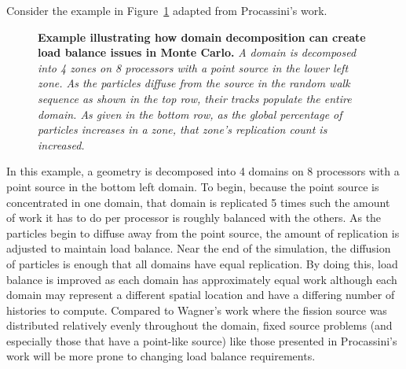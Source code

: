 Consider the example in Figure~\ref{fig:procassini_example} adapted
from Procassini's work.
\begin{figure}[t!]
  \begin{center}
    \scalebox{1.5}{
       }
  \end{center}
  \caption{\textbf{Example illustrating how domain decomposition can
      create load balance issues in Monte Carlo.}  \textit{A domain is
      decomposed into 4 zones on 8 processors with a point source in
      the lower left zone. As the particles diffuse from the source in
      the random walk sequence as shown in the top row, their tracks
      populate the entire domain. As given in the bottom row, as the
      global percentage of particles increases in a zone, that zone's
      replication count is increased.}}
  \label{fig:procassini_example}
\end{figure}
In this example, a geometry is decomposed into 4 domains on 8
processors with a point source in the bottom left domain. To begin,
because the point source is concentrated in one domain, that domain is
replicated 5 times such the amount of work it has to do per processor
is roughly balanced with the others. As the particles begin to diffuse
away from the point source, the amount of replication is adjusted to
maintain load balance. Near the end of the simulation, the diffusion
of particles is enough that all domains have equal replication.  By
doing this, load balance is improved as each domain has approximately
equal work although each domain may represent a different spatial
location and have a differing number of histories to
compute. Compared to Wagner's work where the fission source was
distributed relatively evenly throughout the domain, fixed source
problems (and especially those that have a point-like source) like
those presented in Procassini's work will be more prone to changing
load balance requirements.

